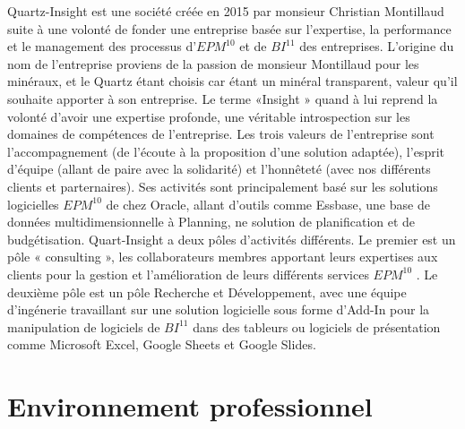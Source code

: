 \documentclass[a4paper, 11pt]{report}
\begin{document}
Quartz-Insight est une société créée en 2015 par monsieur Christian Montillaud suite à une volonté de fonder une entreprise basée sur l’expertise,  la performance et le management des processus d’$EPM^{10}$ et de $BI^{11}$ des entreprises.
L’origine du nom de l’entreprise proviens de la passion de monsieur  Montillaud pour les minéraux, et le Quartz étant choisis car étant un minéral transparent, valeur qu’il souhaite apporter à son entreprise.
Le terme «Insight » quand à lui reprend la volonté d’avoir une expertise profonde, une véritable introspection sur les domaines de compétences de l’entreprise.
\newline
\newline
Les trois valeurs de l’entreprise sont l’accompagnement (de l’écoute à la proposition d’une solution adaptée), l’esprit d’équipe (allant de paire avec la solidarité) et l’honnêteté (avec nos différents clients et parternaires).
\newline
\newline
Ses activités sont principalement basé sur les solutions logicielles $EPM^{10}$  de chez Oracle, allant d’outils comme Essbase, une base de données multidimensionnelle à Planning, ne solution de planification et de budgétisation.
Quart-Insight a deux pôles d’activités différents.
Le premier est un pôle « consulting », les collaborateurs membres apportant leurs expertises aux clients pour la gestion et l’amélioration de leurs différents services $EPM^{10}$ .
Le deuxième pôle est un pôle Recherche et Développement, avec une équipe d’ingénerie travaillant sur une solution logicielle sous forme d’Add-In pour la manipulation de logiciels de $BI^{11}$ dans des tableurs ou logiciels de présentation comme Microsoft Excel, Google Sheets et Google Slides.    
\clearpage

\chapter{Environnement professionnel}
\end{document}
